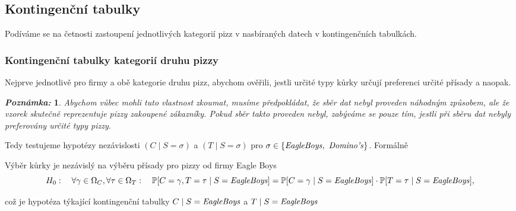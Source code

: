 \documentclass[czech]{article}
\renewcommand\P{\ensuremath{\mathbb{P}}}
\newtheorem*{note}{\textsl{Poznámka:}}
\begin{document}
\subsection{Kontingenční tabulky}%
\label{sub:kontingencni_tabulky}
Podíváme se na četnosti zastoupení jednotlivých kategorií pizz v nasbíraných datech v kontingenčních tabulkách.

\subsubsection{Kontingenční tabulky kategorií druhu pizzy}%
\label{ssub:kontingencní_tabulky_kategorii_druhu_pizzy}

Nejprve jednotlivě pro firmy a obě kategorie druhu pizz, abychom ověřili, jestli určité typy kůrky
určují preferenci určité přísady a naopak.
\begin{note}
	Abychom vůbec mohli tuto vlastnost zkoumat, musíme předpokládat, že sběr dat nebyl proveden
	náhodným způsobem, ale že vzorek skutečně reprezentuje pizzy zakoupené zákazníky. Pokud sběr
	takto proveden nebyl, zabýváme se pouze tím, jestli při sběru dat nebyly preferovány určité typy
	pizzy.
\end{note}
\noindent Tedy testujeme hypotézy nezávislosti $\left( C \mid S =
	\sigma \right)$ a $\left( T \mid S = \sigma \right)$ pro $\sigma \in \left\{ \text{\emph{EagleBoys}}, \text{ \emph{Domino's}} \right\} $. Formálně

\begin{hypothesis}
	\label{hyp:nezavislost_kategorii_eagle}
	Výběr kůrky je nezávislý na výběru přísady pro pizzy od firmy Eagle Boys
	\[
		H_0: \quad \forall \gamma \in \Omega_C, \forall \tau \in \Omega_T: \quad \P[C = \gamma,T =
			\tau \mid S = \text{\emph{EagleBoys}}] = \P[C = \gamma \mid S = \text{\emph{EagleBoys}}]
		\cdot \P[T = \tau \mid S = \text{\emph{EagleBoys}}],
	\]
\end{hypothesis}

\noindent což je hypotéza týkající kontingenční tabulky \(C \mid S = \text{\emph{EagleBoys}}\) a \(T \mid S =
\text{\emph{EagleBoys}}\)
\end{document}

